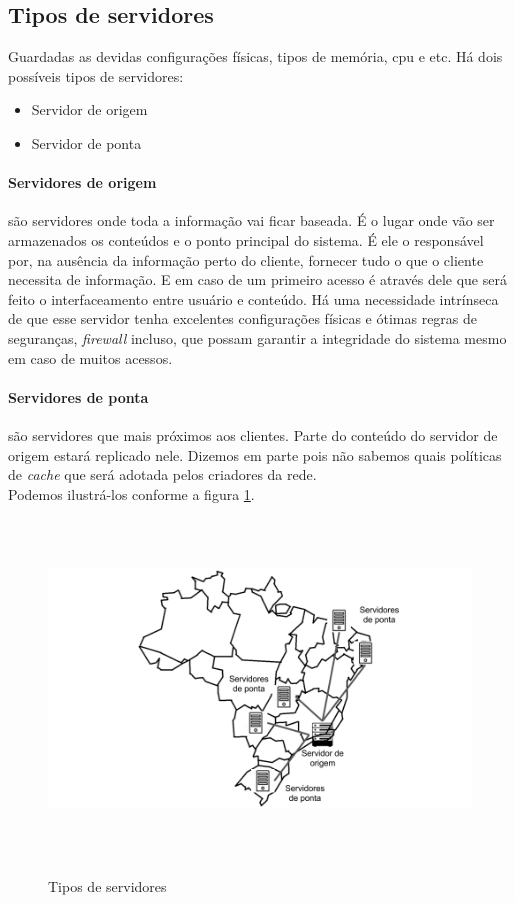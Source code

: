 \subsection{Tipos de servidores}
\label{section:tipos_de_servidores}
Guardadas as devidas configura\c{c}\~oes f\'isicas, tipos de mem\'oria, cpu e etc. H\'a dois poss\'iveis tipos de servidores:
\begin{itemize}
	\item Servidor de origem
	\item Servidor de ponta
\end{itemize}

\paragraph{Servidores de origem}s\~ao servidores onde toda a informa\c{c}\~ao vai ficar baseada. \'E o lugar onde v\~ao ser armazenados os conte\'udos e o ponto principal do sistema.
\newline
\'E ele o respons\'avel por, na aus\^encia da informa\c{c}\~ao perto do cliente, fornecer tudo o que o cliente necessita de informa\c{c}\~ao. E em caso de um primeiro acesso \'e atrav\'es dele que ser\'a feito o interfaceamento entre usu\'ario e conte\'udo.
\newline
H\'a uma necessidade intr\'inseca de que esse servidor tenha excelentes configura\c{c}\~oes f\'isicas e \'otimas regras de seguran\c{c}as, \textit{firewall} incluso, que possam garantir a integridade do sistema mesmo em caso de muitos acessos.
\paragraph{Servidores de ponta}s\~ao servidores que mais pr\'oximos aos clientes. Parte do conte\'udo do servidor de origem estar\'a replicado nele. Dizemos em parte pois n\~ao sabemos quais pol\'iticas de \textit{cache} que ser\'a adotada pelos criadores da rede. 
\\
Podemos ilustr\'a-los conforme a figura \ref{figura:tipos_servidores}.
\begin{figure}[H]
\caption{Tipos de servidores}
\includegraphics[height=9cm]{Figuras/tipos_servidores.png} 
\label{figura:tipos_servidores} 
\end{figure}

